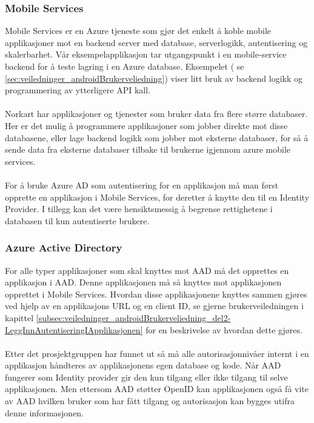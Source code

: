 \subsubsection{Mobile Services}
Mobile Services er en Azure tjeneste som gjør det enkelt å koble mobile applikasjoner mot en backend server med database, serverlogikk, autentisering og skalerbarhet. Vår eksempelapplikasjon tar utgangspunkt i en mobile-service backend for å teste lagring i en Azure database. Eksempelet ( se \ref{sec:veiledninger_androidBrukerveliedning}) viser litt bruk av backend logikk og programmering av ytterligere API kall. \\
\\
Norkart har applikasjoner og tjenester som bruker data fra flere større databaser. Her er det mulig å programmere applikasjoner som jobber direkte mot disse databasene, eller lage backend logikk som jobber mot eksterne databaser, for så å sende data fra eksterne databaser tilbake til brukerne igjennom azure mobile services.\\
\\
For å bruke Azure AD som autentisering for en applikasjon må man først opprette en applikasjon i Mobile Services, for deretter å knytte den til en Identity Provider. I tillegg kan det være hensiktsmessig å begrense rettighetene i databasen til kun autentiserte brukere.

\subsubsection{Azure Active Directory}
For alle typer applikasjoner som skal knyttes mot AAD må det opprettes en applikasjon i AAD. Denne applikasjonen må så knyttes mot applikasjonen opprettet i Mobile Services. Hvordan disse applikasjonene knyttes sammen gjøres ved hjelp av en applikasjons URL og en client ID, se gjerne brukerveiledningen i kapittel \ref{subsec:veiledninger_androidBrukerveliedning_del2-LeggInnAutentiseringIApplikasjonen} for en beskrivelse av hvordan dette gjøres. \\
\\
Etter det prosjektgruppen har funnet ut så må alle autorisasjonnivåer internt i en applikasjon håndteres av applikasjonens egen database og kode. Når AAD fungerer som Identity provider gir den kun tilgang eller ikke tilgang til selve applikasjonen. Men ettersom AAD støtter OpenID kan applikasjonen også få vite av AAD hvilken bruker som har fått tilgang og autorisasjon kan bygges utifra denne informasjonen. 


